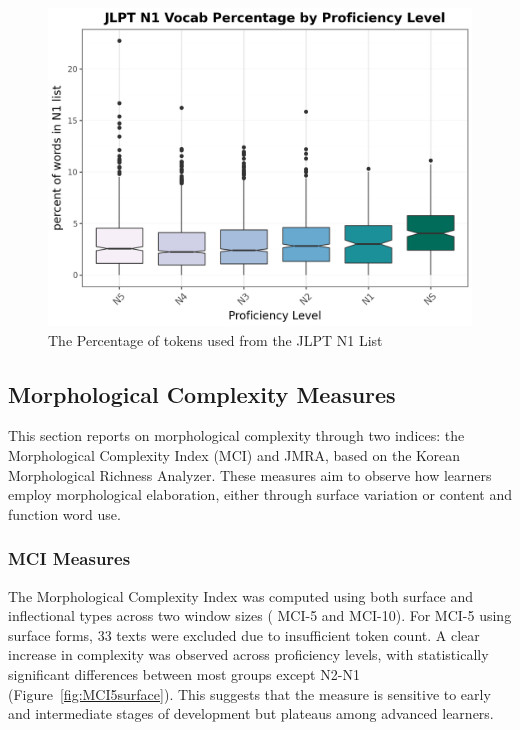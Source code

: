\begin{figure}
           \centering
           \includegraphics[scale=.5]{img/LFP/JLPT_N1}
           \caption[Percentage of tokens used from the JLPT N1 List]{The Percentage of tokens used from the JLPT N1 List}
           \label{fig:JLPTN1vocab}
\end{figure}


\subsection{Morphological Complexity Measures}
This section reports on morphological complexity through two indices: the Morphological Complexity Index (MCI)
\citep{Brezina2019} and JMRA, based on the Korean Morphological Richness Analyzer\citep{Hwang2024}. These
measures aim to observe how learners employ morphological elaboration, either through surface variation or content
and function word use.

\subsubsection{MCI Measures}


The Morphological Complexity Index was computed using both surface and inflectional types across two window sizes (
MCI-5 and MCI-10). For MCI-5 using surface forms, 33 texts were excluded due to insufficient token count. A clear
increase in complexity was observed across proficiency levels, with statistically significant differences between
most groups except N2-N1 (Figure~\ref{fig:MCI5surface}). This suggests that the measure is sensitive to early and
intermediate stages of
development
but plateaus among advanced learners.


